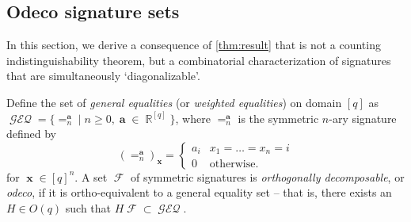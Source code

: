 \documentclass{theoretics}
\DeclareMathOperator{\rr}{\mathbb{R}}
\DeclareMathOperator{\vx}{\mathbf{x}}
\DeclareMathOperator{\va}{\mathbf{a}}
\DeclareMathOperator{\fc}{\mathcal{F}}
\DeclareMathOperator{\geneq}{\mathcal{GEQ}}
\begin{document}
\subsection{Odeco signature sets}
In this section, we derive a consequence of \autoref{thm:result} that is not a counting
indistinguishability theorem,
but a combinatorial characterization of signatures that are simultaneously `diagonalizable'.
\begin{definition}[$\geneq$, odeco]
    Define the set of \emph{general equalities} (or \emph{weighted equalities}) on domain $[q]$ as
    $\geneq = \{=_n^{\va} \mid n \geq 0, \va \in \rr^{[q]}\}$, where $=_n^{\va}$ is the symmetric
    $n$-ary signature defined by
    \[
        (=_n^{\va})_{\vx} = \begin{cases} a_i & x_1 = \ldots = x_n = i \\ 0 & \text{otherwise}.
        \end{cases}
    \]
    for $\vx \in [q]^n$.
    A set $\fc$ of symmetric signatures is \emph{orthogonally decomposable}, or \emph{odeco}, if it is ortho-equivalent
    to a general equality set -- that is, there exists an $H \in O(q)$ such that $H\fc \subset \geneq$.
\end{definition}
\end{document}
